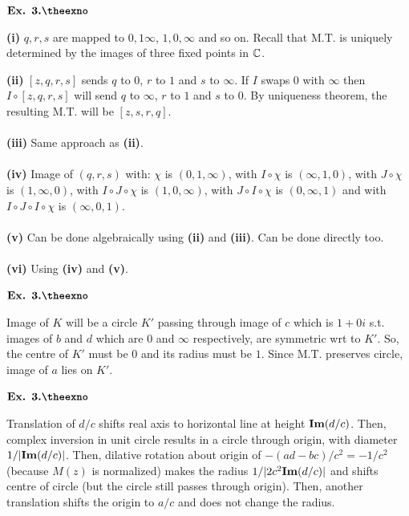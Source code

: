 \documentclass{article}
\def\tf{\textbf}
\def\mf{\ensuremath\mathbf}
\def\mb{\ensuremath\mathbb}
\def\C{\ensuremath\mb{C}}
\newcounter{exno}
\begin{document}
\vspace{0.2in}

${\textbf{Ex. 3.\theexno}}$
\addtocounter{exno}{1}

\tf{(i)} $q,r,s$ are mapped to $0,1\infty$, $1,0,\infty$ and so on. Recall that M.T. is uniquely determined by the images of three fixed points in $\C$.

\tf{(ii)} $[z,q,r,s]$ sends $q$ to $0$, $r$ to $1$ and $s$ to $\infty$. If $I$ swaps $0$ with $\infty$ then $I \circ [z,q,r,s]$ will send $q$ to $\infty$, $r$ to $1$ and $s$ to $0$. By uniqueness theorem, the resulting M.T. will be $[z,s,r,q]$.\\~\\

\tf{(iii)} Same approach as \tf{(ii)}.\\~\\

\tf{(iv)} Image of $(q,r,s)$ with: $\chi$ is $(0,1,\infty)$, with $I\circ \chi$ is $(\infty,1,0)$, with $J \circ \chi$ is $(1,\infty,0)$, with $I\circ J\circ \chi$ is $(1,0,\infty)$, with $J\circ I \circ \chi$ is $(0,\infty,1)$ and with $I\circ J \circ I \circ \chi$ is $(\infty,0,1)$.\\~\\

\tf{(v)} Can be done algebraically using \tf{(ii)} and \tf{(iii)}. Can be done directly too.\\~\\

\tf{(vi)} Using \tf{(iv)} and \tf{(v)}.

\vspace{0.2in}

${\textbf{Ex. 3.\theexno}}$
\addtocounter{exno}{1}

Image of $K$ will be a circle $K'$ passing through image of $c$ which is $1+0i$ s.t. images of $b$ and $d$ which are $0$ and $\infty$ respectively, are symmetric wrt to $K'$. So, the centre of $K'$ must be $0$ and its radius must be $1$. Since M.T. preserves circle, image of $a$ lies on $K'$.

\vspace{0.2in}

${\textbf{Ex. 3.\theexno}}$
\addtocounter{exno}{1}

Translation of $d/c$ shifts real axis to horizontal line at height $\mf{Im}(d/c)$. Then, complex inversion in unit circle results in a circle through origin, with diameter $1/|\mf{Im}(d/c)|$. Then, dilative rotation about origin of $-(ad-bc)/c^2 = -1/c^2$ (because $M(z)$ is normalized) makes the radius $1/|2c^2\mf{Im}(d/c)|$ and shifts centre of circle (but the circle still passes through origin). Then, another translation shifts the origin to $a/c$ and does not change the radius.
\end{document}

